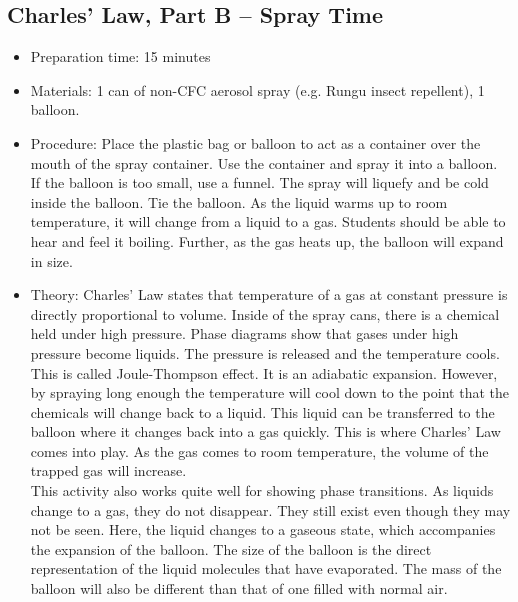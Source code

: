 \subsection{Charles’ Law, Part B – Spray Time}
\begin{itemize}
\item{Preparation time: 15 minutes}
\item{Materials: 1 can of non-CFC aerosol spray (e.g. Rungu insect repellent), 1 balloon.}
\item{Procedure: Place the plastic bag or balloon to act as a container over the mouth of the spray container. Use the container and spray it into a balloon. If the balloon is too small, use a funnel. The spray will liquefy and be cold inside the balloon. Tie the balloon. As the liquid warms up to room temperature, it will change from a liquid to a gas. Students should be able to hear and feel it boiling. Further, as the gas heats up, the balloon will expand in size.}
\item{Theory: Charles’ Law states that temperature of a gas at constant pressure is directly proportional to volume. Inside of the spray cans, there is a chemical held under high pressure. Phase diagrams show that gases under high pressure become liquids. The pressure is released and the temperature cools. This is called Joule-Thompson effect. It is an adiabatic expansion. However, by spraying long enough the temperature will cool down to the point that the chemicals will change back to a liquid. This liquid can be transferred to the balloon where it changes back into a gas quickly. This is where Charles’ Law comes into play. As the gas comes to room temperature, the volume of the trapped gas will increase.\\
This activity also works quite well for showing phase transitions. As liquids change to a gas, they do not disappear. They still exist even though they may not be seen. Here, the liquid changes to a gaseous state, which accompanies the expansion of the balloon. The size of the balloon is the direct representation of the liquid molecules that have evaporated. The mass of the balloon will also be different than that of one filled with normal air.}
\end{itemize}

